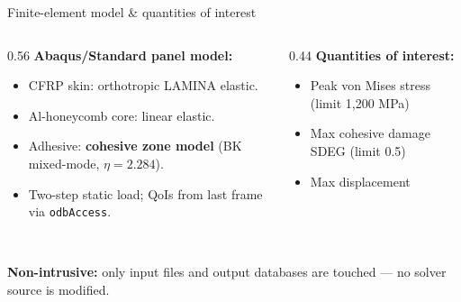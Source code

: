 \documentclass[aspectratio=169,11pt]{beamer}
\begin{document}
\begin{frame}{Finite-element model \& quantities of interest}
\begin{columns}[T]
\begin{column}{0.56\textwidth}
\textbf{Abaqus/Standard panel model:}
\begin{itemize}\small
  \item CFRP skin: orthotropic LAMINA elastic.
  \item Al-honeycomb core: linear elastic.
  \item Adhesive: \textbf{cohesive zone model} (BK mixed-mode, $\eta=2.284$).
  \item Two-step static load; QoIs from last frame via \texttt{odbAccess}.
\end{itemize}
\end{column}
\begin{column}{0.44\textwidth}
\textbf{Quantities of interest:}
\begin{itemize}\small
  \item Peak von Mises stress (limit 1{,}200 MPa)
  \item Max cohesive damage SDEG (limit 0.5)
  \item Max displacement
\end{itemize}
\end{column}
\end{columns}
\vspace{0.1em}
\centering
{}\\[0.3em]
{\footnotesize\color{alertred}\textbf{Non-intrusive:} only input files and output databases are touched --- no solver source is modified.}
\end{frame}
\note{}
\end{document}
